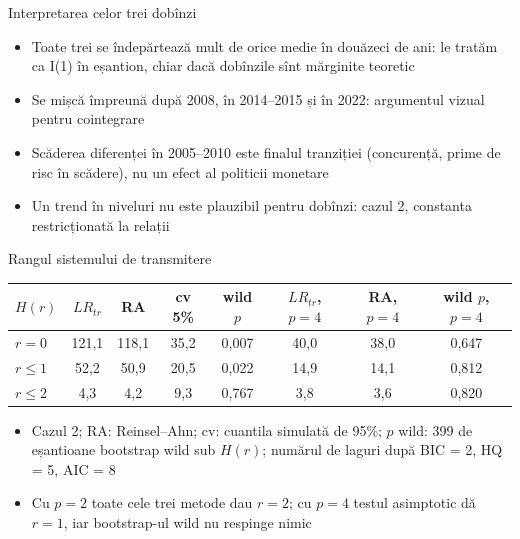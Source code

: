 \begin{frame}{Interpretarea celor trei dobînzi}
\itemsize{\small}
\begin{itemize}
    \item Toate trei se îndepărtează mult de orice medie în douăzeci de ani: le tratăm ca I(1) în eșantion, chiar dacă dobînzile sînt mărginite teoretic
    \item Se mișcă împreună după 2008, în 2014--2015 și în 2022: argumentul vizual pentru cointegrare
    \item Scăderea diferenței în 2005--2010 este finalul tranziției (concurență, prime de risc în scădere), nu un efect al politicii monetare
    \item Un trend în niveluri nu este plauzibil pentru dobînzi: cazul 2, constanta restricționată la relații
\end{itemize}
\end{frame}

\begin{frame}{Rangul sistemului de transmitere}
\itemsize{\small}
\begin{center}
\scriptsize
\begin{tabular}{lccccccc}
\toprule
$H(r)$ & $LR_{tr}$ & RA & cv 5\% & wild $p$ & $LR_{tr}$, $p{=}4$ & RA, $p{=}4$ & wild $p$, $p{=}4$ \\
\midrule
$r = 0$ & 121{,}1 & 118{,}1 & 35{,}2 & 0{,}007 & 40{,}0 & 38{,}0 & 0{,}647 \\
$r \le 1$ & 52{,}2 & 50{,}9 & 20{,}5 & 0{,}022 & 14{,}9 & 14{,}1 & 0{,}812 \\
$r \le 2$ & 4{,}3 & 4{,}2 & 9{,}3 & 0{,}767 & 3{,}8 & 3{,}6 & 0{,}820 \\
\bottomrule
\end{tabular}
\end{center}
\begin{itemize}
    \item Cazul 2; RA: Reinsel--Ahn; cv: cuantila simulată de 95\%; $p$ wild: 399 de eșantioane bootstrap wild sub $H(r)$; numărul de laguri după BIC = 2, HQ = 5, AIC = 8
    \item Cu $p = 2$ toate cele trei metode dau $r = 2$; cu $p = 4$ testul asimptotic dă $r = 1$, iar bootstrap-ul wild nu respinge nimic
\end{itemize}
\end{frame}

